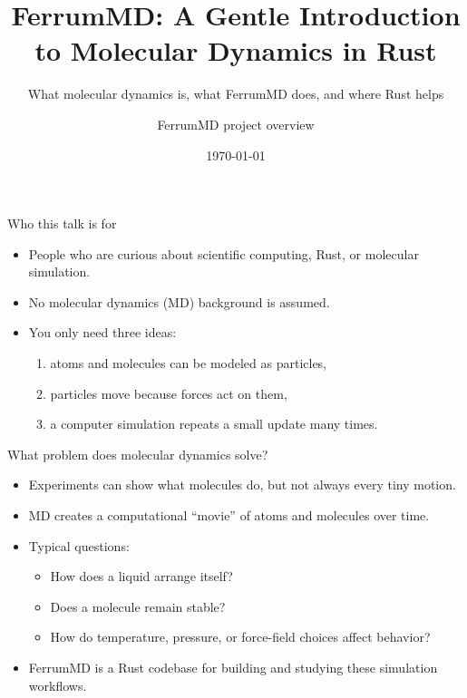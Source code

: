 \documentclass[aspectratio=169]{beamer}
\title{FerrumMD: A Gentle Introduction to Molecular Dynamics in Rust}
\subtitle{What molecular dynamics is, what FerrumMD does, and where Rust helps}
\author{FerrumMD project overview}
\date{\today}
\begin{document}
\begin{frame}
  \titlepage
\end{frame}

\begin{frame}{Who this talk is for}
\begin{itemize}
  \item People who are curious about scientific computing, Rust, or molecular simulation.
  \item No molecular dynamics (MD) background is assumed.
  \item You only need three ideas:
  \begin{enumerate}
    \item atoms and molecules can be modeled as particles,
    \item particles move because forces act on them,
    \item a computer simulation repeats a small update many times.
  \end{enumerate}
\end{itemize}
\end{frame}

\begin{frame}{What problem does molecular dynamics solve?}
\begin{itemize}
  \item Experiments can show what molecules do, but not always every tiny motion.
  \item MD creates a computational ``movie'' of atoms and molecules over time.
  \item Typical questions:
  \begin{itemize}
    \item How does a liquid arrange itself?
    \item Does a molecule remain stable?
    \item How do temperature, pressure, or force-field choices affect behavior?
  \end{itemize}
  \item FerrumMD is a Rust codebase for building and studying these simulation workflows.
\end{itemize}
\end{frame}
\end{document}
